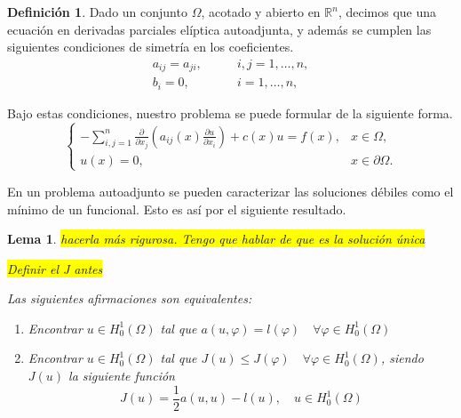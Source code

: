 \documentclass[a4paper,11pt,spanish, twoside, leqno]{tfg-uam}
\newtheorem{lema}[teor]{Lema}
\theoremstyle{definition}
\newtheorem{defin}[teor]{Definici\'on}
\begin{document}
\begin{mdframed}
\begin{defin}
    Dado un conjunto $\Omega$, acotado y abierto en $\mathbb{R}^n$, decimos que una ecuación en derivadas parciales elíptica autoadjunta, y además se cumplen las siguientes condiciones de simetría en los coeficientes.
    \begin{equation}\label{eq:simetria_a}
        \begin{split}
            a_{ij} = a_{ji},\qquad &i,j = 1,\dots,n,\\
            b_i = 0, \qquad &i = 1,\dots,n,
        \end{split}
    \end{equation}
\end{defin}
\end{mdframed}
Bajo estas condiciones, nuestro problema se puede formular de la siguiente forma.
\begin{equation}
    \begin{cases}
        -\sum_{i,j=1}^{n} \frac{\partial}{\partial x_j}\left( a_{ij}(x)\frac{\partial u}{\partial x_i}\right) + c(x)u = f(x), & x\in\Omega,\\
        u(x) = 0, & x\in\partial\Omega.
    \end{cases}
\end{equation}

En un problema autoadjunto se pueden caracterizar las soluciones débiles como el mínimo de un funcional. Esto es así por el siguiente resultado.
\begin{lema} \label{lema:MinimoFuncion}
    \colorbox{yellow}{hacerla más rigurosa. Tengo que hablar de que es la solución única}

    \colorbox{yellow}{Definir el J antes}

    Las siguientes afirmaciones son equivalentes:
    \begin{enumerate}
        \item Encontrar $u\in H_0^1(\Omega)$ tal que $a(u,\varphi) = l(\varphi) \quad \forall \varphi\in H_0^1(\Omega)$
        \item Encontrar $u\in H_0^1(\Omega)$ tal que $J(u) \leq J(\varphi) \quad \forall\varphi\in H_0^1(\Omega)$, siendo $J(u)$ la siguiente función
        \begin{equation*}
            J(u) = \frac{1}{2}a(u,u) - l(u), \quad u\in H_0^1(\Omega)
        \end{equation*}
    \end{enumerate}
\end{lema}
\end{document}
